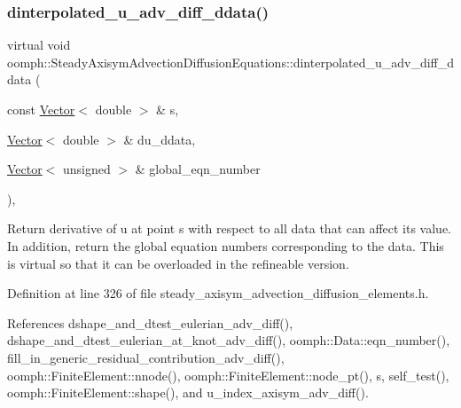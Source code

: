 \subsubsection{\texorpdfstring{dinterpolated\+\_\+u\+\_\+adv\+\_\+diff\+\_\+ddata()}{dinterpolated\_u\_adv\_diff\_ddata()}}
{\footnotesize\ttfamily virtual void oomph\+::\+Steady\+Axisym\+Advection\+Diffusion\+Equations\+::dinterpolated\+\_\+u\+\_\+adv\+\_\+diff\+\_\+ddata (\begin{DoxyParamCaption}\item[{const \hyperlink{classoomph_1_1Vector}{Vector}$<$ double $>$ \&}]{s,  }\item[{\hyperlink{classoomph_1_1Vector}{Vector}$<$ double $>$ \&}]{du\+\_\+ddata,  }\item[{\hyperlink{classoomph_1_1Vector}{Vector}$<$ unsigned $>$ \&}]{global\+\_\+eqn\+\_\+number }\end{DoxyParamCaption})\hspace{0.3cm}{\ttfamily [inline]}, {\ttfamily [virtual]}}



Return derivative of u at point s with respect to all data that can affect its value. In addition, return the global equation numbers corresponding to the data. This is virtual so that it can be overloaded in the refineable version. 



Definition at line 326 of file steady\+\_\+axisym\+\_\+advection\+\_\+diffusion\+\_\+elements.\+h.



References dshape\+\_\+and\+\_\+dtest\+\_\+eulerian\+\_\+adv\+\_\+diff(), dshape\+\_\+and\+\_\+dtest\+\_\+eulerian\+\_\+at\+\_\+knot\+\_\+adv\+\_\+diff(), oomph\+::\+Data\+::eqn\+\_\+number(), fill\+\_\+in\+\_\+generic\+\_\+residual\+\_\+contribution\+\_\+adv\+\_\+diff(), oomph\+::\+Finite\+Element\+::nnode(), oomph\+::\+Finite\+Element\+::node\+\_\+pt(), s, self\+\_\+test(), oomph\+::\+Finite\+Element\+::shape(), and u\+\_\+index\+\_\+axisym\+\_\+adv\+\_\+diff().

\mbox{\label{classoomph_1_1SteadyAxisymAdvectionDiffusionEquations_a0c28aea2e5996566b1a9bf2db033aa49}} 
